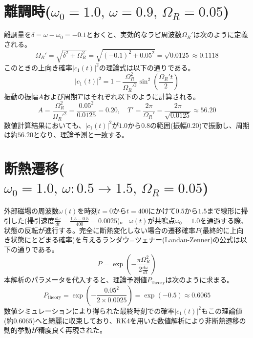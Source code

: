 \documentclass[11pt,a4paper,uplatex]{jsarticle}
\begin{document}
\section{離調時($\omega_0 = 1.0, \, \omega = 0.9, \, \Omega_R = 0.05$)}
離調量を$\delta = \omega - \omega_0 = -0.1$とおくと、実効的なラビ周波数$\Omega_R'$は次のように定義される。
\begin{equation}
    \Omega_R' = \sqrt{\delta^2 + \Omega_R^2} = \sqrt{(-0.1)^2 + 0.05^2} = \sqrt{0.0125} \approx 0.1118
\end{equation}
このときの上向き確率$|c_1(t)|^2$の理論式は以下の通りである。
\begin{equation}
    |c_1(t)|^2 = 1 - \frac{\Omega_R^2}{\Omega_R'^2} \sin^2\left(\frac{\Omega_R' t}{2}\right)
\end{equation}
振動の振幅$A$および周期$T'$はそれぞれ以下のように計算される。
\begin{equation}
    A = \frac{\Omega_R^2}{\Omega_R'^2} = \frac{0.05^2}{0.0125} = 0.20, \quad
    T' = \frac{2\pi}{\Omega_R'} = \frac{2\pi}{\sqrt{0.0125}} \approx 56.20
\end{equation}
数値計算結果においても、$|c_1(t)|^2$が$1.0$から$0.8$の範囲(振幅$0.20$)で振動し、周期は約$56.20$となり、理論予測と一致する。

\section{断熱遷移($\omega_0 = 1.0, \, \omega: 0.5 \rightarrow 1.5, \, \Omega_R = 0.05$)}
外部磁場の周波数$\omega(t)$を時刻$t = 0$から$t = 400$にかけて$0.5$から$1.5$まで線形に掃引した(掃引速度$\frac{d\omega}{dt} = \frac{1.5 - 0.5}{400} = 0.0025$)。
$\omega(t)$が共鳴点$\omega_0 = 1.0$を通過する際、状態の反転が進行する。完全に断熱変化しない場合の遷移確率$P$(最終的に上向き状態にとどまる確率)を与えるランダウ=ツェナー(Landau-Zenner)の公式は以下の通りである。
\begin{equation}
    P = \exp\left( -\frac{\pi \Omega_R^2}{2 \frac{d\omega}{dt}} \right)
\end{equation}
本解析のパラメータを代入すると、理論予測値$P_{\text{theory}}$は次のように求まる。
\begin{equation}
    P_{\text{theory}} = \exp\left( -\frac{0.05^2}{2 \times 0.0025} \right) = \exp(-0.5) \approx 0.6065
\end{equation}
数値シミュレーションにより得られた最終時刻での確率$|c_1(t)|^2$もこの理論値(約$0.6065$)へと綺麗に収束しており、RK4を用いた数値解析により非断熱遷移の動的挙動が精度良く再現された。
\end{document}
